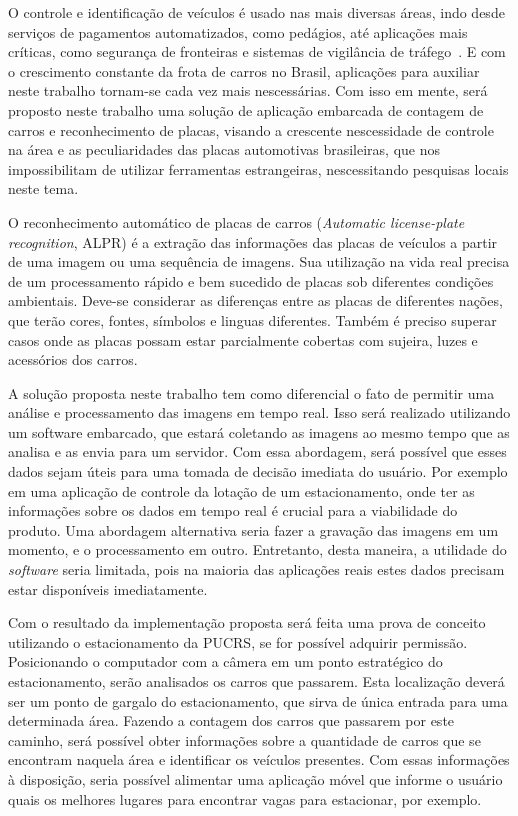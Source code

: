 
O controle e identificação de veículos é usado nas mais diversas áreas, indo
desde serviços de pagamentos automatizados, como pedágios, até aplicações mais
críticas, como segurança de fronteiras e sistemas de vigilância de
tráfego~\cite{ahmad2015automatic}. E com o crescimento constante da frota de
carros no Brasil, aplicações para auxiliar neste trabalho tornam-se cada vez
mais nescessárias. Com isso em mente, será proposto neste trabalho uma solução de
aplicação embarcada de contagem de carros e reconhecimento de placas, visando a
crescente nescessidade de controle na área e as peculiaridades das placas
automotivas brasileiras, que nos impossibilitam de utilizar ferramentas
estrangeiras, nescessitando pesquisas locais neste tema.

O reconhecimento automático de placas de carros (\emph{Automatic license-plate recognition}, ALPR) 
é a extração das informações das placas de veículos a partir de uma imagem ou uma sequência de
imagens. Sua utilização na vida real precisa de um processamento rápido e
bem sucedido de placas sob diferentes condições ambientais. Deve-se considerar as
diferenças entre as placas de diferentes nações, que terão cores, fontes, símbolos e
linguas diferentes. Também é preciso superar casos onde as placas possam estar 
parcialmente cobertas com sujeira, luzes e acessórios dos carros.~\cite{s2013automatic}

A solução proposta neste trabalho tem como diferencial o fato de permitir uma
análise e processamento das imagens em tempo real. Isso será realizado
utilizando um software embarcado, que estará coletando as imagens ao mesmo tempo
que as analisa e as envia para um servidor. Com essa abordagem, será possível 
que esses dados sejam úteis para uma tomada de decisão imediata do usuário. Por exemplo em uma
aplicação de controle da lotação de um estacionamento, onde ter as informações
sobre os dados em tempo real é crucial para a viabilidade do produto. Uma
abordagem alternativa seria fazer a gravação das imagens em um momento, e o 
processamento em outro. Entretanto, desta maneira, a utilidade do \emph{software} seria limitada,
pois na maioria das aplicações reais estes dados precisam estar disponíveis imediatamente.

Com o resultado da implementação proposta será feita uma prova de conceito utilizando o estacionamento da
PUCRS, se for possível adquirir permissão. Posicionando o computador com a câmera em um ponto estratégico 
do estacionamento, serão analisados os carros que passarem. Esta localização deverá ser um ponto de gargalo
do estacionamento, que sirva de única entrada para uma determinada área. Fazendo a contagem dos carros que
passarem por este caminho, será possível obter informações sobre a quantidade de carros que se encontram
naquela área e identificar os veículos presentes. Com essas informações à disposição, seria possível alimentar
uma aplicação móvel que informe o usuário quais os melhores lugares para encontrar vagas para estacionar, por 
exemplo.


